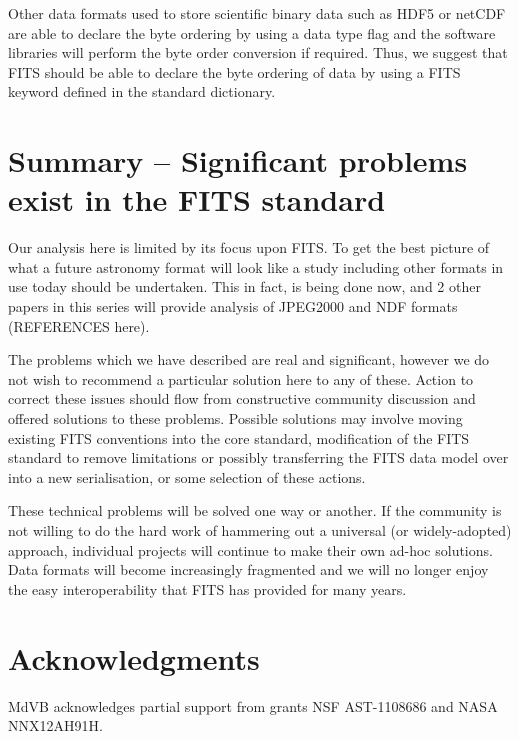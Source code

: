 \documentclass[final,authoryear,5p,times,twocolumn]{elsarticle}
\begin{document}
{{{Other data formats used to store scientific binary data such as HDF5 or
netCDF are able to declare the byte ordering by using a data type flag and
the software libraries will perform the byte order conversion if required.
Thus, we suggest that FITS should be able to declare the byte ordering of
data by using a FITS keyword defined in the standard dictionary.
}


\section{Summary -- Significant problems exist in the FITS standard}


{\color{red}
Our analysis here is limited by its focus upon FITS.
To get the best picture of what a future astronomy format will look like
a study including other formats in use today should be undertaken.
This in fact, is being done now, and 2 other papers in this series will
provide analysis of JPEG2000 and NDF formats (REFERENCES here).
}

The problems which we have described are real and significant, however
we do not wish to recommend a particular solution here to any of
these. Action to correct these issues should flow from constructive
community discussion and offered solutions to these problems. Possible
solutions may involve moving existing FITS conventions into the core
standard, modification of the FITS standard to remove limitations or
possibly transferring the FITS data model over into a new
serialisation, or some selection of these actions.


These technical problems will be solved one way or another. If the
community is not willing to do the hard work of hammering out a
universal (or widely-adopted) approach, individual projects will
continue to make their own ad-hoc solutions. Data formats will become
increasingly fragmented and we will no longer enjoy the easy
interoperability that FITS has provided for many years.

\section{Acknowledgments}


MdVB acknowledges partial support from grants NSF AST-1108686 and NASA
NNX12AH91H.




}}
\end{document}
